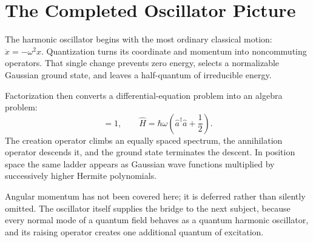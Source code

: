 \begin{classroomqa}
\end{classroomqa}

\section{The Completed Oscillator Picture}

The harmonic oscillator begins with the most ordinary classical motion:
\(\ddot x=-\omega^2x\). Quantization turns its coordinate and momentum into
noncommuting operators. That single change prevents zero energy, selects a
normalizable Gaussian ground state, and leaves a half-quantum of irreducible
energy.

Factorization then converts a differential-equation problem into an algebra
problem:
\begin{equation}
  [\hat a,\hat a^\dagger]=1,
  \qquad
  \hat H=\hbar\omega
  \left(\hat a^\dagger\hat a+\frac12\right).
\end{equation}
The creation operator climbs an equally spaced spectrum, the annihilation
operator descends it, and the ground state terminates the descent. In
position space the same ladder appears as Gaussian wave functions multiplied
by successively higher Hermite polynomials.

Angular momentum has not been covered here; it is deferred rather than
silently omitted. The oscillator itself supplies the bridge to the next
subject, because every normal mode of a quantum field behaves as a quantum
harmonic oscillator, and its raising operator creates one additional quantum
of excitation.
